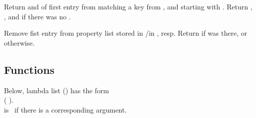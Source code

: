 \begin{LIST}{1cm}
  Return  and  of first entry from 
  matching a key from , and  starting with . Return \retval{\NIL},
  \retvalii{\NIL}, and  \retvaliii{\NIL} if there was no .

  Remove fist entry  from property list stored in
  /in , resp. Return \retval{\T} if 
  was there, or \retval{\NIL} otherwise.

\end{LIST}


\subsection{Functions}
\label{section:Functions}


Below, lambda list () has the form\\
(
).\\
 is \T\ if there is a corresponding argument.

